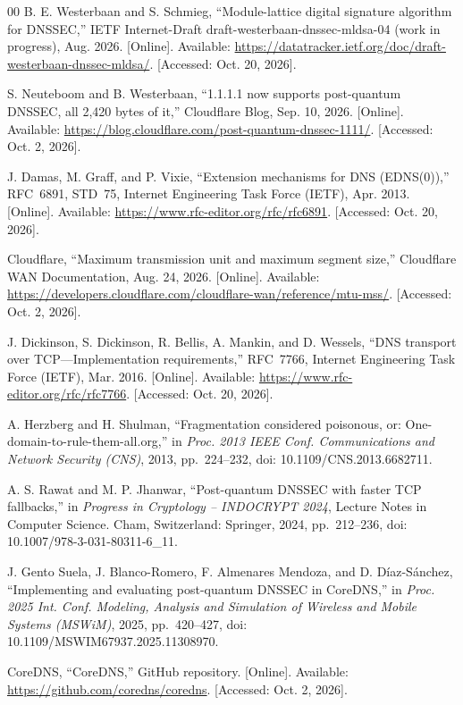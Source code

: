 \documentclass[conference]{IEEEtran}
\begin{document}
\begin{thebibliography}{00}
 B. E. Westerbaan and S. Schmieg, ``Module-lattice digital signature algorithm for DNSSEC,'' IETF Internet-Draft draft-westerbaan-dnssec-mldsa-04 (work in progress), Aug. 2026. [Online]. Available: \url{https://datatracker.ietf.org/doc/draft-westerbaan-dnssec-mldsa/}. [Accessed: Oct. 20, 2026].

 S. Neuteboom and B. Westerbaan, ``1.1.1.1 now supports post-quantum DNSSEC, all 2,420 bytes of it,'' Cloudflare Blog, Sep. 10, 2026. [Online]. Available: \url{https://blog.cloudflare.com/post-quantum-dnssec-1111/}. [Accessed: Oct. 2, 2026].

 J. Damas, M. Graff, and P. Vixie, ``Extension mechanisms for DNS (EDNS(0)),'' RFC~6891, STD~75, Internet Engineering Task Force (IETF), Apr. 2013. [Online]. Available: \url{https://www.rfc-editor.org/rfc/rfc6891}. [Accessed: Oct. 20, 2026].

 Cloudflare, ``Maximum transmission unit and maximum segment size,'' Cloudflare WAN Documentation, Aug. 24, 2026. [Online]. Available: \url{https://developers.cloudflare.com/cloudflare-wan/reference/mtu-mss/}. [Accessed: Oct. 2, 2026].

 J. Dickinson, S. Dickinson, R. Bellis, A. Mankin, and D. Wessels, ``DNS transport over TCP---Implementation requirements,'' RFC~7766, Internet Engineering Task Force (IETF), Mar. 2016. [Online]. Available: \url{https://www.rfc-editor.org/rfc/rfc7766}. [Accessed: Oct. 20, 2026].

 A. Herzberg and H. Shulman, ``Fragmentation considered poisonous, or: One-domain-to-rule-them-all.org,'' in \emph{Proc. 2013 IEEE Conf. Communications and Network Security (CNS)}, 2013, pp.~224--232, doi: 10.1109/CNS.2013.6682711.

 A. S. Rawat and M. P. Jhanwar, ``Post-quantum DNSSEC with faster TCP fallbacks,'' in \emph{Progress in Cryptology -- INDOCRYPT 2024}, Lecture Notes in Computer Science. Cham, Switzerland: Springer, 2024, pp.~212--236, doi: 10.1007/978-3-031-80311-6\_11.

 J. Gento Suela, J. Blanco-Romero, F. Almenares Mendoza, and D. D\'iaz-S\'anchez, ``Implementing and evaluating post-quantum DNSSEC in CoreDNS,'' in \emph{Proc. 2025 Int. Conf. Modeling, Analysis and Simulation of Wireless and Mobile Systems (MSWiM)}, 2025, pp.~420--427, doi: 10.1109/MSWIM67937.2025.11308970.

 CoreDNS, ``CoreDNS,'' GitHub repository. [Online]. Available: \url{https://github.com/coredns/coredns}. [Accessed: Oct. 2, 2026].


\end{thebibliography}
\end{document}
